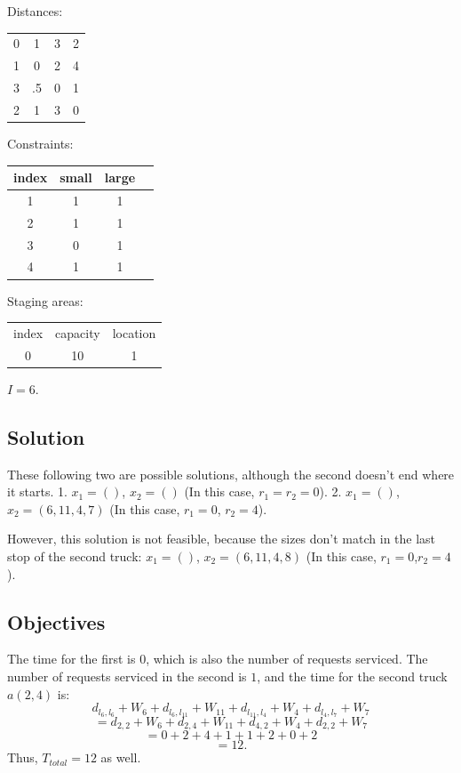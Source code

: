 \documentclass{article}
\begin{document}
Distances:

\begin{tabular} { c c c c }
0  & 1  & 3 & 2 \\
1  & 0  & 2 & 4 \\
3  & .5 & 0 & 1 \\
2  & 1  & 3 & 0 \\
\end{tabular}

Constraints:

\begin{tabular} {c | c   c   c }
index     &    small   &   large \\
\hline
  1       &    1       &      1 \\
  2       &    1       &      1 \\
  3       &    0       &      1 \\
  4       &    1       &      1 \\
\end{tabular}

Staging areas:

\begin{tabular} {c c c }
index     &   capacity & location \\
 0        &     10     &    1     \\
\end{tabular}

$I = 6$.


\subsection{Solution}

These following two are possible solutions, although the second doesn't end where it starts.
1. $x_1 = ()$, $x_2 = ()$ (In this case, $r_1 = r_2 = 0$).
2. $x_1 = ()$, $x_2 = (6, 11, 4, 7)$ (In this case, $r_1 = 0$, $r_2 = 4$).

However, this solution is not feasible, because the sizes don't match in the last stop of the second truck:
$x_1 = ()$, $x_2 = (6, 11, 4, 8)$ (In this case, $r_1 = 0$,$ r_2 = 4$).

\subsection{Objectives}

The time for the first is $0$, which is also the number of requests serviced.
The number of requests serviced in the second is $1$, and the time for the second truck $a(2, 4)$ is:
$$d_{l_6,l_6} + W_6 + d_{l_6,l_{11}} + W_{11} + d_{l_{11}, l_4} + W_{4} + d_{l_4,l_7} + W_7$$
$$ = d_{2,2} + W_6 + d_{2,4} + W_{11} + d_{4, 2} + W_{4} + d_{2,2} + W_7$$
$$ = 0 + 2 + 4 + 1 + 1 + 2 + 0 + 2 $$
$$ = 12. $$
Thus, $T_{total} = 12$ as well.
\end{document}
